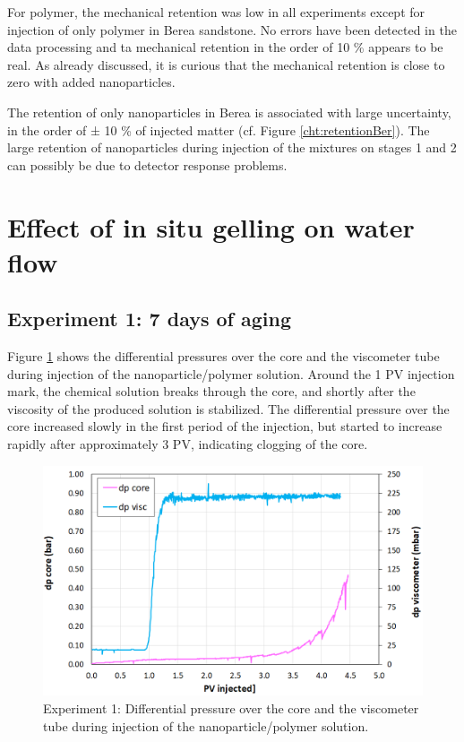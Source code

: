 For polymer, the mechanical retention was low in all experiments except for injection of only polymer in Berea sandstone. No errors have been detected in the data processing and ta mechanical retention in the order of 10 \% appears to be real. As already discussed, it is curious that the mechanical retention is close to zero with added nanoparticles. 

The retention of only nanoparticles in Berea is associated with large uncertainty, in the order of ± 10 \% of injected matter (cf. Figure \ref{cht:retentionBer}). The large retention of nanoparticles during injection of the mixtures on stages 1 and 2 can possibly be due to detector response problems. 


\section{ Effect of in situ gelling on water flow}
\subsection{Experiment 1: 7 days of aging}
 Figure \ref{cht:gelexp1_1} shows the differential pressures over the core and the viscometer tube during injection of the nanoparticle/polymer solution. Around the 1 PV injection mark, the chemical solution breaks through the core, and shortly after the viscosity of the produced solution is stabilized. The differential pressure over the core increased slowly in the first period of the injection, but started to increase rapidly after approximately 3 PV, indicating clogging of the core.

\begin{figure}[h!]
    \centering
    \includegraphics[width=\textwidth]{img/cht/gelexp1_1.png}
    \caption{Experiment 1: Differential pressure over the core and the viscometer tube during injection of the nanoparticle/polymer solution.}
    \label{cht:gelexp1_1} %
\end{figure}

